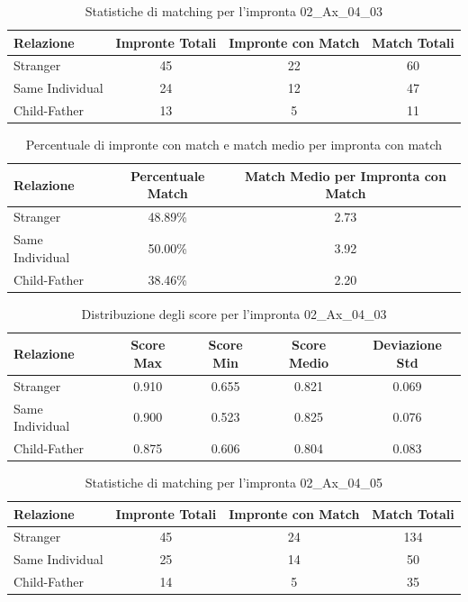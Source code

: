 \begin{table}[htbp]
\centering
\caption{Statistiche di matching per l'impronta 02\_Ax\_04\_03}
\label{tab:results_02_Ax_04_03}
\begin{tabular}{|l|c|c|c|}
\hline
\textbf{Relazione} & \textbf{Impronte Totali} & \textbf{Impronte con Match} & \textbf{Match Totali} \\
\hline
Stranger & 45 & 22 & 60 \\
\hline
Same Individual & 24 & 12 & 47 \\
\hline
Child-Father & 13 & 5 & 11 \\
\hline
\end{tabular}
\end{table}


\begin{table}[htbp]
\centering
\caption{Percentuale di impronte con match e match medio per impronta con match}
\label{tab:match_percentage_02_Ax_04_03}
\begin{tabular}{|l|c|c|}
\hline
\textbf{Relazione} & \textbf{Percentuale Match} & \textbf{Match Medio per Impronta con Match} \\
\hline
Stranger & 48.89\% & 2.73 \\
\hline
Same Individual & 50.00\% & 3.92 \\
\hline
Child-Father & 38.46\% & 2.20 \\
\hline
\end{tabular}
\end{table}


\begin{table}[htbp]
\centering
\caption{Distribuzione degli score per l'impronta 02\_Ax\_04\_03}
\label{tab:scores_02_Ax_04_03}
\begin{tabular}{|l|c|c|c|c|}
\hline
\textbf{Relazione} & \textbf{Score Max} & \textbf{Score Min} & \textbf{Score Medio} & \textbf{Deviazione Std} \\
\hline
Stranger & 0.910 & 0.655 & 0.821 & 0.069 \\
\hline
Same Individual & 0.900 & 0.523 & 0.825 & 0.076 \\
\hline
Child-Father & 0.875 & 0.606 & 0.804 & 0.083 \\
\hline
\end{tabular}
\end{table}


\begin{table}[htbp]
\centering
\caption{Statistiche di matching per l'impronta 02\_Ax\_04\_05}
\label{tab:results_02_Ax_04_05}
\begin{tabular}{|l|c|c|c|}
\hline
\textbf{Relazione} & \textbf{Impronte Totali} & \textbf{Impronte con Match} & \textbf{Match Totali} \\
\hline
Stranger & 45 & 24 & 134 \\
\hline
Same Individual & 25 & 14 & 50 \\
\hline
Child-Father & 14 & 5 & 35 \\
\hline
\end{tabular}
\end{table}


